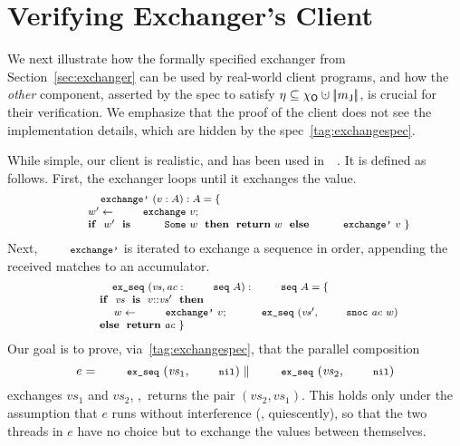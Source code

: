 \section{Verifying Exchanger's Client}
\label{sec:cal}
\newcommand{\ts}{\mathit{ts}}
\newcommand{\vvs}{\mathit{vs}}
\newcommand{\acc}{\mathit{ac}}
\newcommand{\ws}{\mathit{ws}}
\newcommand{\sorted}[1]{\mathsf{sorted}\ #1}


We next illustrate how the formally specified exchanger from
Section~\ref{sec:exchanger} can be used by real-world client programs,
and how the \emph{other} component, asserted by the spec to satisfy
$\gist \subseteq \histo \hunion \mygather{\pending}$, is crucial for
their verification.
%
We emphasize that the proof of the client does not see the
implementation details, which are hidden by the
spec~\eqref{tag:exchangespec}.
%

While simple, our client is realistic, and has been used
in~~\cite{ExchangerClass}. It is defined as
follows. First, the exchanger loops until it exchanges the value.
%
\vspace{-2pt}
\[
\vspace{-2pt}
{\small{
\begin{array}{rl}
& \esc{exchange'}~(v : A) : A = \{\\[1pt]
&  ~~~~ w' \Asgn \esc{exchange}~v;\\[1pt]
&  ~~~~
  \kw{if}~~w'~~\kw{is}~~\esc{Some}~w~~\kw{then}~~\kw{return}~w~~\kw{else}~~\esc{exchange'}~v~\}
\end{array}
}}
\]
%
Next, $\esc{exchange'}$ is iterated to exchange a sequence in order,
appending the received matches to an accumulator.
%
\[
{\small{
\begin{array}{rl}
& \esc{ex\_seq}~(\vvs, \acc : \esc{seq}~A) : \esc{seq}~A = \{\\[1pt]
& ~~~~ \kw{if}~~\vvs~~\kw{is}~~v{::}\vvs'~~\kw{then}\\[1pt]
& ~~~~ ~~~~ w \Asgn \esc{exchange'}~v;~~\esc{ex\_seq}~(\vvs', \esc{snoc}~\acc~w)\\[1pt]
& ~~~~ \kw{else}~~\kw{return}~\acc~\}
\end{array}
}}
\]
%
Our goal is to prove, via~\eqref{tag:exchangespec},
that the parallel composition
%
\[
e = \esc{ex\_seq}~(\vvs_1, \esc{nil}) \parallel \esc{ex\_seq}~(\vvs_2, \esc{nil})
\]
%
exchanges $\vvs_1$ and $\vvs_2$, \ie,~returns the pair $(\vvs_2,
\vvs_1)$. This holds only under the assumption that $e$ runs without
interference (\ie, quiescently), so that the two threads in $e$ have
no choice but to exchange the values between themselves. 

